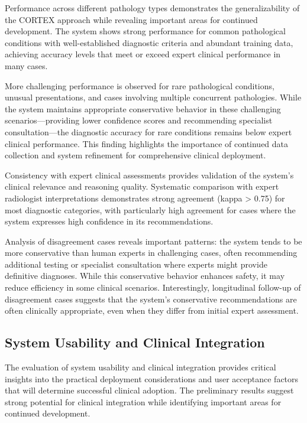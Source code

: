 Performance across different pathology types demonstrates the generalizability of the CORTEX approach while revealing important areas for continued development. The system shows strong performance for common pathological conditions with well-established diagnostic criteria and abundant training data, achieving accuracy levels that meet or exceed expert clinical performance in many cases.

More challenging performance is observed for rare pathological conditions, unusual presentations, and cases involving multiple concurrent pathologies. While the system maintains appropriate conservative behavior in these challenging scenarios—providing lower confidence scores and recommending specialist consultation—the diagnostic accuracy for rare conditions remains below expert clinical performance. This finding highlights the importance of continued data collection and system refinement for comprehensive clinical deployment.

Consistency with expert clinical assessments provides validation of the system's clinical relevance and reasoning quality. Systematic comparison with expert radiologist interpretations demonstrates strong agreement (kappa > 0.75) for most diagnostic categories, with particularly high agreement for cases where the system expresses high confidence in its recommendations.

Analysis of disagreement cases reveals important patterns: the system tends to be more conservative than human experts in challenging cases, often recommending additional testing or specialist consultation where experts might provide definitive diagnoses. While this conservative behavior enhances safety, it may reduce efficiency in some clinical scenarios. Interestingly, longitudinal follow-up of disagreement cases suggests that the system's conservative recommendations are often clinically appropriate, even when they differ from initial expert assessment.

\subsection{System Usability and Clinical Integration}

The evaluation of system usability and clinical integration provides critical insights into the practical deployment considerations and user acceptance factors that will determine successful clinical adoption. The preliminary results suggest strong potential for clinical integration while identifying important areas for continued development.

